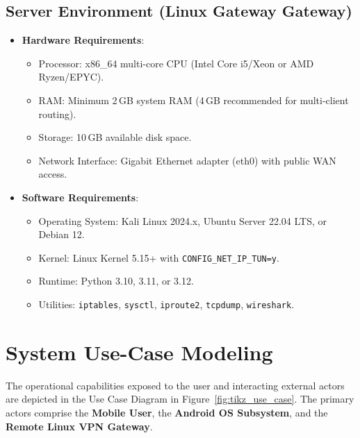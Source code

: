 \subsection{Server Environment (Linux Gateway Gateway)}
\begin{itemize}
    \item \textbf{Hardware Requirements}:
    \begin{itemize}
        \item Processor: x86\_64 multi-core CPU (Intel Core i5/Xeon or AMD Ryzen/EPYC).
        \item RAM: Minimum 2\,GB system RAM (4\,GB recommended for multi-client routing).
        \item Storage: 10\,GB available disk space.
        \item Network Interface: Gigabit Ethernet adapter (eth0) with public WAN access.
    \end{itemize}
    \item \textbf{Software Requirements}:
    \begin{itemize}
        \item Operating System: Kali Linux 2024.x, Ubuntu Server 22.04 LTS, or Debian 12.
        \item Kernel: Linux Kernel 5.15+ with \texttt{CONFIG\_NET\_IP\_TUN=y}.
        \item Runtime: Python 3.10, 3.11, or 3.12.
        \item Utilities: \texttt{iptables}, \texttt{sysctl}, \texttt{iproute2}, \texttt{tcpdump}, \texttt{wireshark}.
    \end{itemize}
\end{itemize}

\section{System Use-Case Modeling}
\label{sec:use_case_modeling}

The operational capabilities exposed to the user and interacting external actors are depicted in the Use Case Diagram in Figure~\ref{fig:tikz_use_case}. The primary actors comprise the \textbf{Mobile User}, the \textbf{Android OS Subsystem}, and the \textbf{Remote Linux VPN Gateway}.

